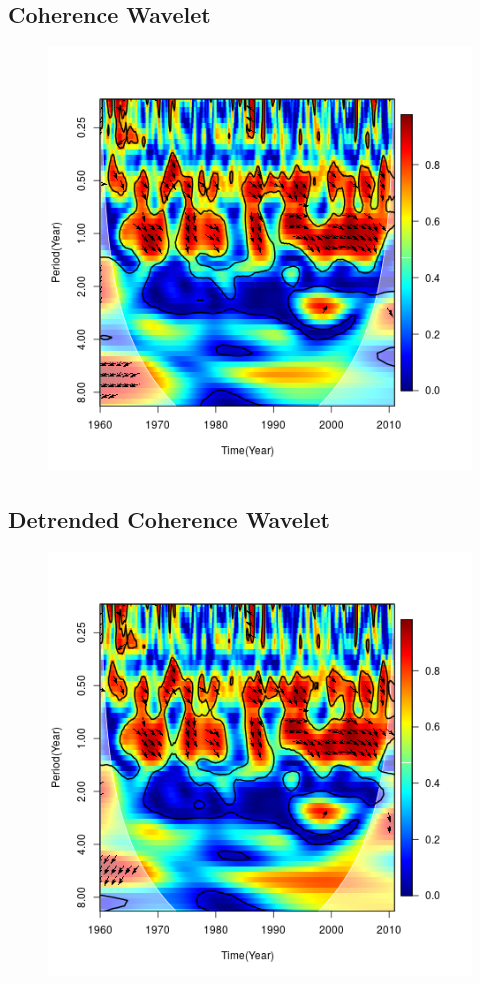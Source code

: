 \documentclass[12pt,a4paper]{article}
\begin{document}
\subsection{Coherence Wavelet}
\begin{figure}[h]
	\centering
	\includegraphics[width=0.7\linewidth]{wavelet_coherence}
	\caption{}
	\label{fig:waveletcoherence}
\end{figure}
\newpage
\subsection{Detrended Coherence Wavelet}
\begin{figure}[h]
	\centering
	\includegraphics[width=0.7\linewidth]{wavelet_coherenceD}
	\caption{}
	\label{fig:waveletcoherenced}
\end{figure}
\end{document}
